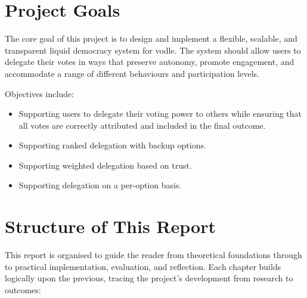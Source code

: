 \section{Project Goals}

The core goal of this project is to design and implement a flexible, scalable, and transparent liquid democracy system for vodle. The system should allow users to delegate their votes in ways that preserve autonomy, promote engagement, and accommodate a range of different behaviours and participation levels.

Objectives include:
\begin{itemize}
    \item Supporting users to delegate their voting power to others while ensuring that all votes are correctly attributed and included in the final outcome.
    \item Supporting ranked delegation with backup options.
    \item Supporting weighted delegation based on trust.
    \item Supporting delegation on a per-option basis.
\end{itemize}

\section{Structure of This Report}

This report is organised to guide the reader from theoretical foundations through to practical implementation, evaluation, and reflection. Each chapter builds logically upon the previous, tracing the project's development from research to outcomes:

